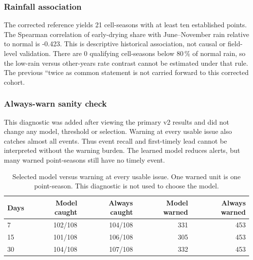 \subsubsection{Rainfall association}

The corrected reference yields 21 cell-seasons with at least ten established points. The Spearman correlation of early-drying share with June--November rain relative to normal is -0.423. This is descriptive historical association, not causal or field-level validation. There are 0 qualifying cell-seasons below 80\,\% of normal rain, so the low-rain versus other-years rate contrast cannot be estimated under that rule. The previous ``twice as common statement is not carried forward to this corrected cohort.

\subsubsection{Always-warn sanity check}

This diagnostic was added after viewing the primary v2 results and did not change any model, threshold or selection. Warning at every usable issue also catches almost all events. Thus event recall and first-timely lead cannot be interpreted without the warning burden. The learned model reduces alerts, but many warned point-seasons still have no timely event.

\begin{table}[H]
\centering
\footnotesize
\caption{Selected model versus warning at every usable issue. One warned unit is one point-season. This diagnostic is not used to choose the model.}
\label{tab:r_always_warn}
\begin{tabularx}{\textwidth}{@{}Xrrrr@{}}
\toprule
\textbf{Days} & \textbf{Model caught} & \textbf{Always caught} & \textbf{Model warned} & \textbf{Always warned} \\
\midrule
7 & 102/108 & 104/108 & 331 & 453 \\
15 & 101/108 & 106/108 & 305 & 453 \\
30 & 104/108 & 107/108 & 332 & 453 \\
\bottomrule
\end{tabularx}
\end{table}
